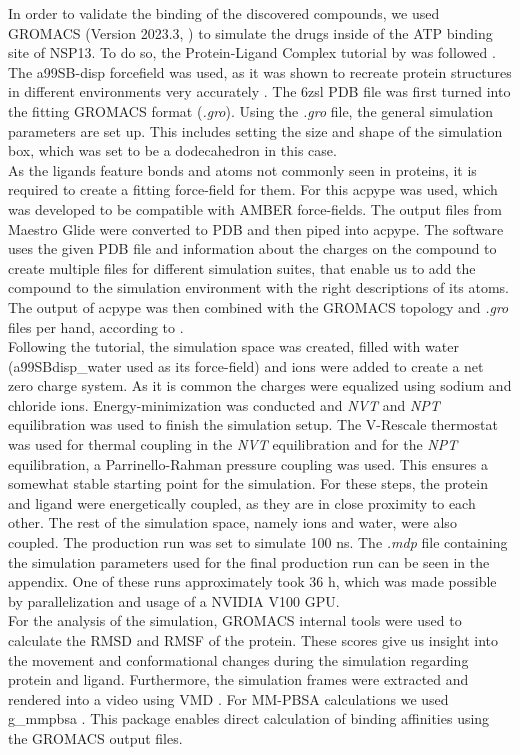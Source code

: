 \documentclass[11pt, letterpaper, titlepage]{article}
\renewcommand{\cite}{\parencite}
\begin{document}
In order to validate the binding of the discovered compounds, we used GROMACS (Version 2023.3, \textcite{packageGROMACS}) to simulate the drugs inside of the ATP binding site of NSP13. To do so, the Protein-Ligand Complex tutorial by  was followed \cite{Lemkul2018}. The a99SB-disp forcefield was used, as it was shown to recreate protein structures in different environments very accurately \cite{Forcefield}. The 6zsl PDB file was first turned into the fitting GROMACS format (\textit{.gro}). Using the \textit{.gro} file, the general simulation parameters are set up. This includes setting the size and shape of the simulation box, which was set to be a dodecahedron in this case. \\ 
As the ligands feature bonds and atoms not commonly seen in proteins, it is required to create a fitting force-field for them. For this acpype \cite{acpype} was used, which was developed to be compatible with AMBER force-fields. The output files from Maestro Glide were converted to PDB and then piped into acpype. The software uses the given PDB file and information about the charges on the compound to create multiple files for different simulation suites, that enable us to add the compound to the simulation environment with the right descriptions of its atoms.  The output of acpype was then combined with the GROMACS topology and \textit{.gro} files per hand, according to . \\
Following the tutorial, the simulation space was created, filled with water (a99SBdisp\_water used as its force-field) and ions were added to create a net zero charge system. As it is common the charges were equalized using sodium and chloride ions. Energy-minimization was conducted and \textit{NVT} and \textit{NPT} equilibration was used to finish the simulation setup. The V-Rescale thermostat was used for thermal coupling in the \textit{NVT} equilibration and for the \textit{NPT} equilibration, a Parrinello-Rahman pressure coupling was used. This ensures a somewhat stable starting point for the simulation. For these steps, the protein and ligand were energetically coupled, as they are in close proximity to each other. The rest of the simulation space, namely ions and water, were also coupled. The production run was set to simulate 100 ns. The \textit{.mdp} file containing the simulation parameters used for the final production run can be seen in the appendix. One of these runs approximately took 36 h, which was made possible by parallelization and usage of a NVIDIA V100 GPU. \\ 
For the analysis of the simulation, GROMACS internal tools were used to calculate the RMSD and RMSF of the protein. These scores give us insight into the movement and conformational changes during the simulation regarding protein and ligand. Furthermore, the simulation frames were extracted and rendered into a video using VMD \cite{VMD}. For MM-PBSA calculations we used g\_mmpbsa \cite{MMPBSA1, MMPBSA2}. This package enables direct calculation of binding affinities using the GROMACS output files.
\end{document}

